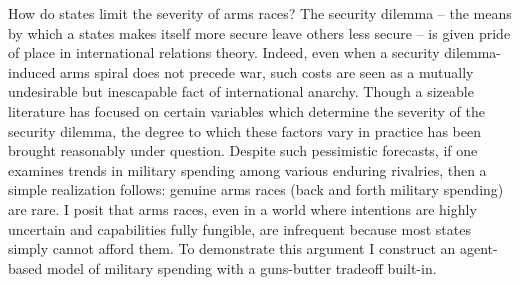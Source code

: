 \documentclass[12pt]{article}
\renewenvironment{abstract}
{{%
\setlength{\leftmargin}{0mm}
    \setlength{\rightmargin}{\leftmargin}%
}%
\relax}
{\endlist}
\begin{document}
\begin{abstract}
\noindent How do states limit the severity of arms races? The security dilemma -- the means by which a states makes itself more secure leave others less secure -- is given pride of place in international relations theory. Indeed, even when a security dilemma-induced arms spiral does not precede war, such costs are seen as a mutually undesirable but inescapable fact of international anarchy. Though a sizeable literature has focused on certain variables which determine the severity of the security dilemma, the degree to which these factors vary in practice has been brought reasonably under question. Despite such pessimistic forecasts, if one examines trends in military spending among various enduring rivalries, then a simple realization follows: genuine arms races (back and forth military spending) are rare. I posit that arms races, even in a world where intentions are highly uncertain and capabilities fully fungible, are infrequent because most states simply cannot afford them. To demonstrate this argument I construct an agent-based model of military spending with a guns-butter tradeoff built-in. %


\hbox{\vrule height .2pt width 39.14pc}

\end{abstract}

\vskip 6.5pt
\end{document}
